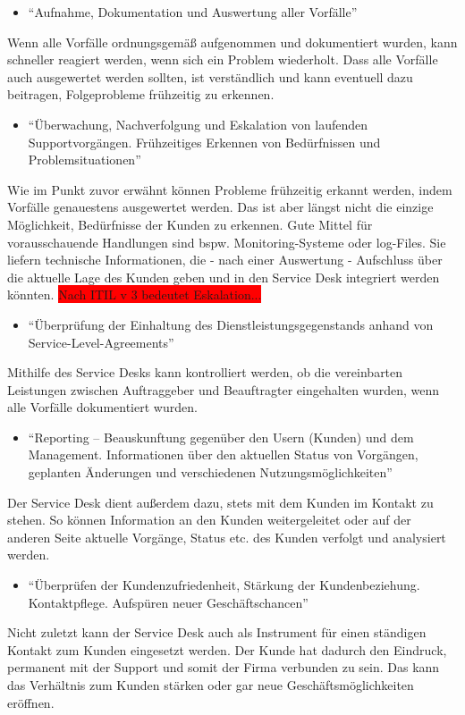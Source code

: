 \begin{itemize}
\item \enquote{Aufnahme, Dokumentation und Auswertung aller Vorfälle}
\end{itemize}
\noindent
Wenn alle Vorfälle ordnungsgemäß aufgenommen und dokumentiert wurden, kann schneller reagiert werden, wenn sich ein Problem wiederholt. Dass alle Vorfälle auch ausgewertet werden sollten, ist verständlich und kann eventuell dazu beitragen, Folgeprobleme frühzeitig zu erkennen.

\begin{itemize}
\item \enquote{Überwachung, Nachverfolgung und Eskalation von laufenden
Supportvorgängen. Frühzeitiges Erkennen von
Bedürfnissen und Problemsituationen}
\end{itemize}
\noindent
Wie im Punkt zuvor erwähnt können Probleme frühzeitig erkannt werden, indem Vorfälle genauestens ausgewertet werden. Das ist aber längst nicht die einzige Möglichkeit, Bedürfnisse der Kunden zu erkennen. Gute Mittel für vorausschauende Handlungen sind  bspw. Monitoring-Systeme oder log-Files. Sie liefern technische Informationen, die - nach einer Auswertung - Aufschluss über die aktuelle Lage des Kunden geben und in den Service Desk integriert werden könnten.   \colorbox{red}{Nach ITIL v 3 bedeutet Eskalation...}


\begin{itemize}
\item \enquote{Überprüfung der Einhaltung des Dienstleistungsgegenstands
anhand von Service-Level-Agreements}
\end{itemize}
\noindent
Mithilfe des Service Desks kann kontrolliert werden, ob die vereinbarten Leistungen zwischen Auftraggeber und Beauftragter eingehalten wurden, wenn alle Vorfälle dokumentiert wurden.

\begin{itemize}
\item \enquote{Reporting – Beauskunftung gegenüber den Usern (Kunden)
und dem Management. Informationen über den aktuellen
Status von Vorgängen, geplanten Änderungen und
verschiedenen Nutzungsmöglichkeiten}
\end{itemize}
\noindent
Der Service Desk dient außerdem dazu, stets mit dem Kunden im Kontakt zu stehen. So können Information an den Kunden weitergeleitet oder auf der anderen Seite aktuelle Vorgänge, Status etc. des Kunden verfolgt und analysiert werden. 

\begin{itemize}
\item \enquote{Überprüfen der Kundenzufriedenheit, Stärkung der Kundenbeziehung.
Kontaktpflege. Aufspüren neuer Geschäftschancen}
\end{itemize}
\noindent
Nicht zuletzt kann der Service Desk auch als Instrument für einen ständigen Kontakt zum Kunden eingesetzt werden. Der Kunde hat dadurch den Eindruck, permanent mit der Support und somit der Firma verbunden zu sein. Das kann das Verhältnis zum Kunden stärken oder gar neue Geschäftsmöglichkeiten eröffnen.\\

